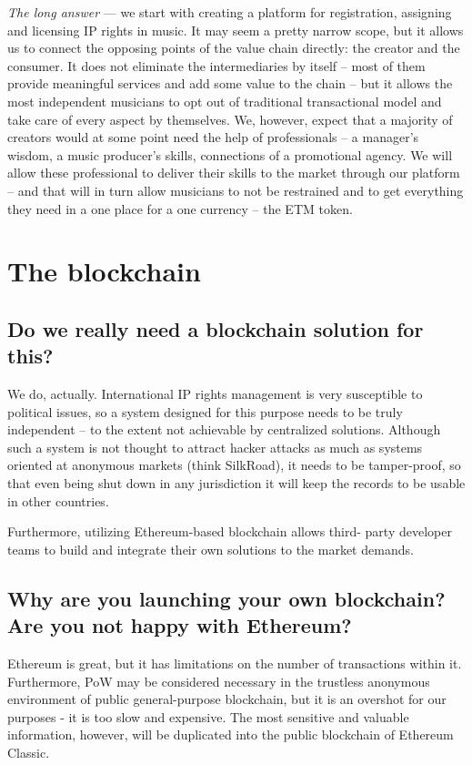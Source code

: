 \documentclass[12pt]{report}
\begin{document}
\textit{The long answer} — we start with creating a platform for registration, assigning and licensing IP rights in music. It may seem a pretty narrow scope, but it allows us to connect the opposing points of the value chain directly: the creator and the consumer. It does not eliminate the intermediaries by itself – most of them provide meaningful services and add some value to the chain – but it allows the most independent musicians to opt out of traditional transactional model and take care of every aspect by themselves.
We, however, expect that a majority of creators would at some point need the help of professionals – a manager's wisdom, a music producer's skills, connections of a promotional agency. We will allow these professional to deliver their skills to the market through our platform – and that will in turn allow musicians to not be restrained and to get everything they need in a one place for a one currency – the ETM token.

\chapter{The blockchain}
\label{blockchain}

\section{Do we really need a blockchain solution for this?}
\label{blockchain-solution}
We do, actually. International IP rights management is very susceptible to political issues, so a system designed for this purpose needs to be truly independent – to the extent not achievable by centralized solutions. Although such a system is not thought to attract hacker attacks as much as systems oriented at anonymous markets (think SilkRoad), it needs to be tamper-proof, so that even being shut down in any jurisdiction it will keep the records to be usable in other countries.

Furthermore, utilizing Ethereum-based blockchain allows third- party developer teams to build and integrate their own solutions to the market demands.

\section{Why are you launching your own blockchain? Are you not happy with Ethereum?}
\label{blockchain-ethereum}
Ethereum is great, but it has limitations on the number of transactions within it. Furthermore, PoW may be considered necessary in the trustless anonymous environment of public general-purpose blockchain, but it is an overshot for our purposes - it is too slow and expensive. The most sensitive and valuable information, however, will be duplicated into the public blockchain of Ethereum Classic.
\end{document}

